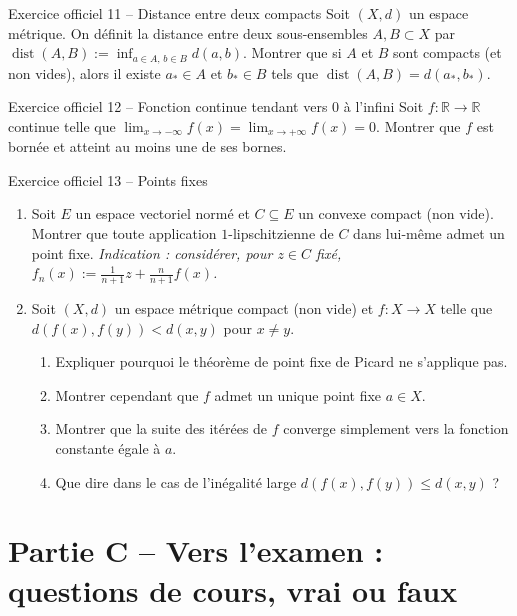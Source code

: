 \documentclass[11pt,a4paper]{article}
\newcommand{\R}{\mathbb{R}}
\newcommand{\dist}{\operatorname{dist}}
\theoremstyle{definition}
\begin{document}
\begin{exo}{Exercice officiel 11 -- Distance entre deux compacts}
Soit $(X,d)$ un espace métrique. On définit la distance entre deux sous-ensembles $A,B\subset X$ par $\dist(A,B):=\inf_{a\in A,\,b\in B}d(a,b)$. Montrer que si $A$ et $B$ sont compacts (et non vides), alors il existe $a_*\in A$ et $b_*\in B$ tels que $\dist(A,B)=d(a_*,b_*)$.
\end{exo}

\begin{exo}{Exercice officiel 12 -- Fonction continue tendant vers $0$ à l'infini}
Soit $f:\R\to\R$ continue telle que $\lim_{x\to-\infty}f(x)=\lim_{x\to+\infty}f(x)=0$. Montrer que $f$ est bornée et atteint au moins une de ses bornes.
\end{exo}

\begin{exo}{Exercice officiel 13 -- Points fixes}
\begin{enumerate}[label=\arabic*.]
  \item Soit $E$ un espace vectoriel normé et $C\subseteq E$ un convexe compact (non vide). Montrer que toute application $1$-lipschitzienne de $C$ dans lui-même admet un point fixe. \emph{Indication : considérer, pour $z\in C$ fixé, $f_n(x):=\frac{1}{n+1}z+\frac{n}{n+1}f(x)$.}
  \item Soit $(X,d)$ un espace métrique compact (non vide) et $f:X\to X$ telle que $d(f(x),f(y))<d(x,y)$ pour $x\ne y$.
  \begin{enumerate}[label=(\alph*)]
    \item Expliquer pourquoi le théorème de point fixe de Picard ne s'applique pas.
    \item Montrer cependant que $f$ admet un unique point fixe $a\in X$.
    \item Montrer que la suite des itérées de $f$ converge simplement vers la fonction constante égale à $a$.
    \item Que dire dans le cas de l'inégalité large $d(f(x),f(y))\le d(x,y)$ ?
  \end{enumerate}
\end{enumerate}
\end{exo}

\section*{Partie C -- Vers l'examen : questions de cours, vrai ou faux}
\end{document}
